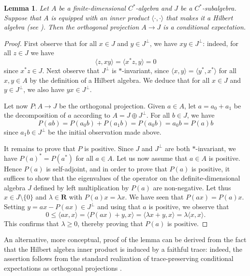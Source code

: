 \documentclass[12pt,a4paper]{amsproc}
\newtheorem{lemma}[theorem]{Lemma}
\theoremstyle{definition}
\newcommand{\RR}{\mathbf R}
\begin{document}
\begin{lemma}\label{lem:f-d-hilbert-algebra}
Let $A$ be a finite-dimensional $C^*$-algebra and $J$ be a $C^*$-subalgebra. Suppose that $A$ is equipped with an inner product $\langle \cdot, \cdot \rangle$ that makes it a Hilbert algebra (see \cite[A.54]{Dixmier}). Then the orthogonal projection $A \to J$ is a conditional expectation. 
\end{lemma}
\begin{proof}
First observe that for all $x \in J$ and $y \in J^\perp$, we have $xy \in J^\perp$: indeed, for all $z \in J$ we have
$$\langle z, xy \rangle = \langle x^*z, y \rangle =0$$
since $x^*z \in J$. Next observe that  $J^\perp$ is $*$-invariant, since $\langle x, y \rangle = \langle y^*, x^* \rangle$ for all $x, y \in A$ by the definition of a Hilbert algebra. We deduce that for all $x \in J$ and $y \in J^\perp$, we also have  $yx \in J^\perp$. 

Let now $P \colon A \to J$ be the orthogonal projection. Given  $a \in A$, let $a = a_0 + a_1$ be the decomposition of $a$ according to $A = J \oplus J^\perp$. For all $b \in J$, we have 
$$P(ab) = P(a_0 b) + P(a_1 b) = P(a_0 b) = a_0 b = P(a)b$$
since $a_1b \in J^\perp$ be the initial observation made above. 

It remains to prove that $P$ is positive. Since $J$ and $J^\perp$ are both $*$-invariant, we have $P(a)^* = P(a^*)$ for all $a \in A$. Let us now assume that $a \in A$ is  positive. Hence   $P(a)$ is self-adjoint, and in order to prove   that $P(a)$ is positive, it suffices to show that the eigenvalues of the operator on the definite-dimensional algebra $J$ defined by left multiplication by $P(a)$ are non-negative. Let thus $
x \in J\setminus \{0\} $ and $\lambda \in \RR$ with $P(a)x = \lambda x$. We have seen that $P(ax) = P(a)x$. Setting $y = ax - P(ax) \in J^\perp$ and using that $a$ is positive, we observe that  
$$0 \leq \langle ax, x \rangle = \langle P(ax) + y,  x \rangle = \langle \lambda x+y, x\rangle = \lambda \langle   x, x\rangle.$$
This confirms that $\lambda \geq 0$, thereby proving that $P(a)$ is positive.  
\end{proof}

An alternative, more conceptual, proof of the lemma can be derived from the fact that the Hilbert algebra inner product is induced by a faithful trace: indeed, the assertion   follows from the standard realization of
trace-preserving conditional expectations as orthogonal projections \cite[Theorem~9.1.2 and Remark~9.1.3]{AnantharamanPopa}.
\end{document}
